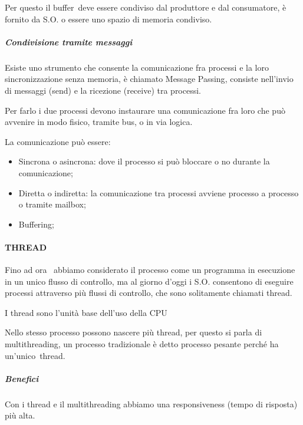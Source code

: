 \documentclass[
]{article}
\providecommand{\tightlist}{%
  \setlength{\itemsep}{0pt}\setlength{\parskip}{0pt}}
\begin{document}
{}

{}

{Per questo il }{buffer}{~deve essere condiviso dal produttore e dal
consumatore, è fornito da S.O. o essere uno spazio di memoria
condiviso.}

\subparagraph{\texorpdfstring{{Condivisione tramite
messaggi}}{Condivisione tramite messaggi}}\label{h.i6jc8w97gtf3}

{Esiste uno strumento che consente la comunicazione fra processi e la
loro sincronizzazione senza memoria, è chiamato }{Message Passing}{,
consiste nell'invio di messaggi (}{send}{) e la ricezione (}{receive}{)
tra processi.}

{Per farlo i due processi devono instaurare una comunicazione fra loro
che può avvenire in modo fisico, tramite bus, o in via logica.}

{La comunicazione può essere:}

\begin{itemize}
\tightlist
\item
  {Sincrona o asincrona: dove il processo si può bloccare o no durante
  la comunicazione;}
\item
  {Diretta o indiretta: la comunicazione tra processi avviene processo a
  processo o tramite mailbox;}
\item
  {Buffering;}
\end{itemize}

{}

\paragraph{\texorpdfstring{{THREAD}}{THREAD}}\label{h.5tai6lrtweui}

{Fino ad ora ~abbiamo considerato il processo come un programma in
esecuzione in un unico flusso di controllo, ma al giorno d'oggi i S.O.
consentono di eseguire processi attraverso più flussi di controllo, che
sono solitamente chiamati thread.}

{}

{I thread sono l'unità base dell'uso della CPU}

{}

{Nello stesso processo possono nascere più thread, per questo si parla
di multithreading, un processo tradizionale è detto processo pesante
perché ha }{un'unico}{~thread.}

\subparagraph{\texorpdfstring{{Benefici}}{Benefici}}\label{h.r2y8qpbi42ch}

{Con i thread e il multithreading abbiamo una responsiveness (tempo di
risposta) più alta. }
\end{document}
